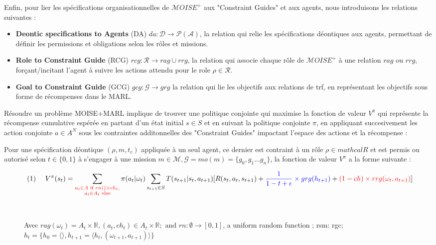 \documentclass[sigconf,anonymous]{aamas}
\begin{document}
Enfin, pour lier les spécifications organisationnelles de $\mathcal{M}OISE^+$ aux "Constraint Guides" et aux agents, nous introduisons les relations suivantes :
\begin{itemize}
    \item \textbf{Deontic specifications to Agents} (DA) \quad $da: \mathcal{D} \rightarrow \mathcal{P}(\mathcal{A})$, la relation qui relie les spécifications déontiques aux agents, permettant de définir les permissions et obligations selon les rôles et missions.
    \item \textbf{Role to Constraint Guide} (RCG) \quad $rcg: \mathcal{R} \rightarrow rag \cup rrg$, la relation qui associe chaque rôle de $\mathcal{M}OISE^+$ à une relation $rag$ ou $rrg$, forçant/incitant l'agent à suivre les actions attendu pour le role $\rho \in \mathcal{R}$.
    \item \textbf{Goal to Constraint Guide} (GCG) \quad $gcg: \mathcal{G} \rightarrow grg$ la relation qui lie les objectifs aux relations de trf, en représentant les objectifs sous forme de récompenses dans le MARL.
\end{itemize}

Résoudre un problème MOISE+MARL implique de trouver une politique conjointe qui maximise la fonction de valeur $V^\pi$ qui représente la récompense cumulative espérée en partant d'un état initial $s \in S$ et en suivant la politique conjointe $\pi$, en appliquant succesivement les action conjointe $a \in A^N$ sous les contraintes additonnelles des "Constraint Guides" impactant l'espace des actions et la récompense :

Pour une spécification déontique $(\rho,m,t_c)$ appliquée à un seul agent, ce dernier est contraint à un rôle $\rho \in mathcal{R}$ et est permis ou autorisé selon $t \in \{0,1\}$ à s'engager à une mission $m \in \mathcal{M}, \mathcal{G} = mo(m) = \{g_0, g_1 \dots g_n\}$, la fonction de valeur $V^\pi$ a la forme suivante :

\begin{figure*}

\begin{gather*}
  \text{ (1) \quad}V^\pi(s_t) = \sum_{\textcolor{red}{ \substack{a_{t} \in A \text{ if } rn() > ch_{t}, \\ 
  a_{t} \in A_{t} \text{ else}}
  }}{\pi(a_{t} | \omega_t)} \sum_{s_{t+1} \in S}{T(s_{t+1} | s_t, a_{t+1})[R(s_t,a_{t},s_{t+1}) + \textcolor{blue}{ \frac{1}{1 - t + \epsilon} \times grg(h_{t+1}) } + \textcolor{red}{(1-ch) \times rrg(\omega_t,a_{t+1})}]}
\end{gather*}

\

Avec $rag(\omega_t) = A_{t} \times \mathbb{R}, (a_t, ch_{t}) \in A_{t} \times \mathbb{R} ; \text{ and } rn: \emptyset \to [0,1]$, a uniform random function ; rsm: rgc; $h_t = \{h_0 = \langle \rangle, h_{t+1} = \langle h_t, (\omega_{t+1}, a_{t+1}) \rangle \}$
\end{figure*}
\end{document}
